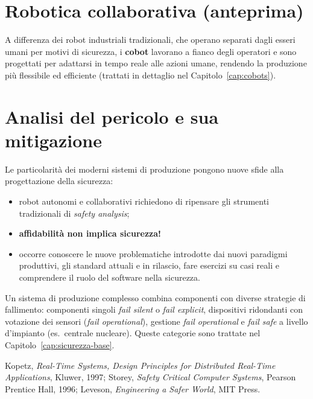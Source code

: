 \section{Robotica collaborativa (anteprima)}
A differenza dei robot industriali tradizionali, che operano separati dagli esseri umani per motivi di sicurezza, i \textbf{cobot} lavorano a fianco degli operatori e sono progettati per adattarsi in tempo reale alle azioni umane, rendendo la produzione più flessibile ed efficiente (trattati in dettaglio nel Capitolo~\ref{cap:cobots}).

\section{Analisi del pericolo e sua mitigazione}
Le particolarità dei moderni sistemi di produzione pongono nuove sfide alla progettazione della sicurezza:
\begin{itemize}
    \item robot autonomi e collaborativi richiedono di ripensare gli strumenti tradizionali di \emph{safety analysis};
    \item \textbf{affidabilità non implica sicurezza!}
    \item occorre conoscere le nuove problematiche introdotte dai nuovi paradigmi produttivi, gli standard attuali e in rilascio, fare esercizi su casi reali e comprendere il ruolo del software nella sicurezza.
\end{itemize}

Un sistema di produzione complesso combina componenti con diverse strategie di fallimento: componenti singoli \emph{fail silent} o \emph{fail explicit}, dispositivi ridondanti con votazione dei sensori (\emph{fail operational}), gestione \emph{fail operational} e \emph{fail safe} a livello d'impianto (es.\ centrale nucleare). Queste categorie sono trattate nel Capitolo~\ref{cap:sicurezza-base}.

\begin{note}
Kopetz, \emph{Real-Time Systems, Design Principles for Distributed Real-Time Applications}, Kluwer, 1997; Storey, \emph{Safety Critical Computer Systems}, Pearson Prentice Hall, 1996; Leveson, \emph{Engineering a Safer World}, MIT Press.
\end{note}
